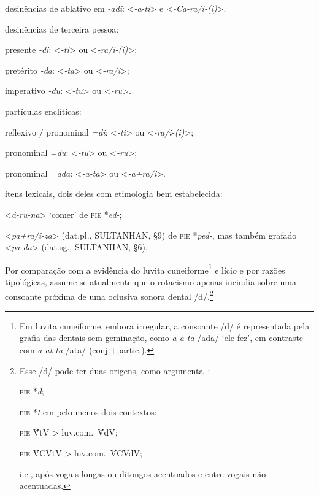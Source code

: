 \begin{compactenum}
	\item desinências de ablativo em \emph{-adi}: <\emph{-a-ti}> e
	<\emph{-Ca-ra\slash{}i-{(i)}}>.
	\item desinências de terceira pessoa:
	\begin{compactenum}
		\item presente \emph{-di}: <\emph{-ti}> ou <\emph{-ra\slash{}i-{(i)}}>;
		\item pretérito \emph{-da}: <\emph{-ta}> ou <\emph{-ra\slash{}i}>;
		\item imperativo \emph{-du}: <\emph{-tu}> ou <\emph{-ru}>.
	\end{compactenum}
	\item partículas enclíticas:
	\begin{compactenum}
		\item reflexivo / pronominal \emph{=di}: <\emph{-ti}> ou <\emph{-ra\slash{}i-{(i)}}>;
		\item pronominal \emph{=du}: <\emph{-tu}> ou <\emph{-ru}>;
		\item pronominal \emph{=ada}: <\emph{-a-ta}> ou <\emph{-a+ra\slash{}i}>.
	\end{compactenum}
	\item itens lexicais, dois deles com etimologia bem estabelecida:
	\begin{compactenum}
		\item <\emph{á-ru-na}> `comer' de \textsc{pie} *\emph{ed-};
		\item <\emph{pa+ra\slash{}i-za}> (dat.pl., SULTANHAN, §9) de
		\textsc{pie} *\emph{ped-}, mas também grafado <\emph{pa-da}> (dat.sg.,
		SULTANHAN, §6).
	\end{compactenum}
\end{compactenum}
Por comparação com a evidência do luvita cuneiforme\footnote{Em luvita
	cuneiforme, embora irregular, a consoante /d/ é representada pela grafia das
	dentais sem geminação, como \emph{a-a-ta} /ada/ `ele fez', em contraste com
	\emph{a-at-ta} /ata/ (conj.+partic.).}
e lício e por razões tipológicas, assume-se atualmente que o rotacismo apenas
incindia sobre uma consoante próxima de uma oclusiva sonora dental
/d/.\footnote{Esse /d/ pode ter duas origens, como
	argumenta~\textcite{MorpurgoDavies1982}:
	\begin{inparaenum}
		\item \textsc{pie} *\emph{d};
		\item \textsc{pie} *\emph{t} em pelo menos dois contextos:
		\begin{inparaenum}
			\item \textsc{pie} V̄́tV > luv.com.\ V̄́dV;\@
			\item \textsc{pie} V́CVtV > luv.com.\ V́CVdV;\@
		\end{inparaenum}
	\end{inparaenum}
	i.e., após vogais longas ou ditongos acentuados e entre vogais não acentuadas.
}
